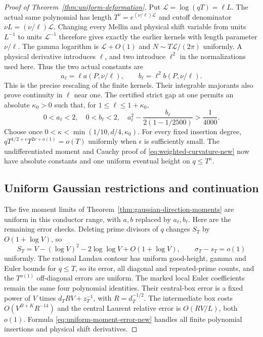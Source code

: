 \begin{proof}[Proof of Theorem~\ref{thm:uniform-deformation}]
Put $\mathcal L=\log(qT)=\ell L$. The actual same polynomial has
length $T^\nu=e^{(\nu/\ell)\mathcal L}$ and cutoff denominator
$\nu L=(\nu/\ell)\mathcal L$.
Changing every Mellin and physical shift variable from units $L^{-1}$
to units $\mathcal L^{-1}$ therefore gives exactly the earlier
kernels with length parameter $\nu/\ell$.
The gamma logarithm is $\mathcal L+O(1)$ and
$N\sim T\mathcal L/(2\pi)$ uniformly. A physical derivative
introduces $\ell$, and two introduce $\ell^2$ in the normalizations
used here. Thus the two actual constants are
\begin{equation}\label{eq:uniform-moment-constants-new}
                  a_\ell=\ell a(P,\nu/\ell),\qquad
                  b_\ell=\ell^2b(P,\nu/\ell).
\end{equation}
This is the precise rescaling of the finite kernels.
Their integrable majorants also prove continuity in $\ell$ near one.
The certified strict gap at one permits an absolute $\kappa_0>0$
such that, for $1\le\ell\le1+\kappa_0$,
\[
 0<a_\ell<2,\quad0<b_\ell<2,\quad
 a_\ell^2-\frac{b_\ell}{2(1-1/2500)}>\frac1{4000}.
\]
Choose once $0<\kappa<\min(1/10,d/4,\kappa_0)$.
For every fixed insertion degree,
$qT^{1/2+\epsilon}T^{2\nu+o(1)}=o(T)$ uniformly when $\epsilon$
is sufficiently small. The undifferentiated moment and Cauchy proof
of \eqref{eq:weighted-curvature-new} now have absolute constants
and one uniform eventual height on $q\le T^\kappa$.

\subsection{Uniform Gaussian restrictions and continuation}
The five moment limits of Theorem~\ref{thm:gaussian-direction-moments}
are uniform in this conductor range, with $a,b$ replaced by
$a_\ell,b_\ell$. Here are the remaining error checks.
Deleting prime divisors of $q$ changes $S_T$ by $O(1+\log V)$, so
\[
 S_T=V-(\log V)^2-2\log\log V+O(1+\log V),\qquad
                      \sigma_T-s_T=o(1)
\]
uniformly. The rational Landau contour has uniform good-height,
gamma and Euler bounds for $q\le T$, so its error, all diagonal
and repeated-prime counts, and the $T^{o(1)}$ off-diagonal errors
are uniform. The marked local Euler coefficients remain the same
four polynomial identities. Their central-box error is a fixed
power of $V$ times $d_TRV+z_T^{-1}$, with $R=d_T^{-1/2}$.
The intermediate box costs $O(V^{B+K}R^{-14})$ and the central
Laurent relative error is $O(RV/L)$, both $o(1)$. Formula
\eqref{eq:uniform-moment-error-new} handles all finite polynomial
insertions and physical shift derivatives.


\end{proof}
